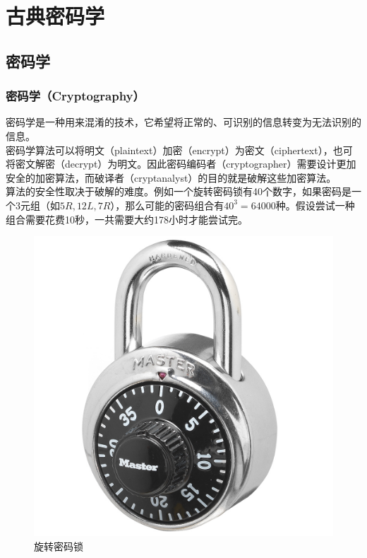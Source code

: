 \chapter{古典密码学}

\section{密码学}

\subsection{密码学（Cryptography）}

密码学是一种用来混淆的技术，它希望将正常的、可识别的信息转变为无法识别的信息。\\

密码学算法可以将明文（plaintext）加密（encrypt）为密文（ciphertext），也可将密文解密（decrypt）为明文。因此密码编码者（cryptographer）需要设计更加安全的加密算法，而破译者（cryptanalyst）的目的就是破解这些加密算法。\\

算法的安全性取决于破解的难度。例如一个旋转密码锁有40个数字，如果密码是一个3元组（如$ 5R, 12L, 7R $），那么可能的密码组合有$ 40^3 = 64000 $种。假设尝试一种组合需要花费10秒，一共需要大约178小时才能尝试完。\\

\begin{figure}[H]
    \centering
    \includegraphics[scale=0.6]{img/Chapter1/1-1/1.png}
    \caption{旋转密码锁}
\end{figure}

